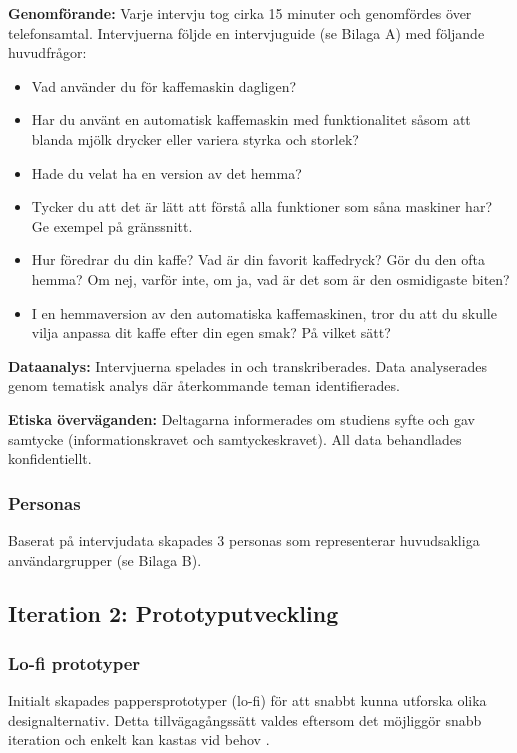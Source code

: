 \textbf{Genomförande:} Varje intervju tog cirka 15 minuter och genomfördes över telefonsamtal. Intervjuerna följde en intervjuguide (se Bilaga A) med följande huvudfrågor:
\begin{itemize}
    \item Vad använder du för kaffemaskin dagligen? 
    \item Har du använt en automatisk kaffemaskin med funktionalitet såsom att blanda mjölk drycker eller variera styrka och storlek?
    \item Hade du velat ha en version av det hemma? 
    \item Tycker du att det är lätt att förstå alla funktioner som såna maskiner har? Ge exempel på gränssnitt. 
    \item Hur föredrar du din kaffe? Vad är din favorit kaffedryck? Gör du den ofta hemma? Om nej, varför inte, om ja, vad är det som är den osmidigaste biten? 
    \item I en hemmaversion av den automatiska kaffemaskinen, tror du att du skulle vilja anpassa dit kaffe efter din egen smak? På vilket sätt? 
\end{itemize}

\textbf{Dataanalys:} Intervjuerna spelades in och transkriberades. Data analyserades genom tematisk analys där återkommande teman identifierades.

\textbf{Etiska överväganden:} Deltagarna informerades om studiens syfte och gav samtycke (informationskravet och samtyckeskravet). All data behandlades konfidentiellt.


\subsubsection{Personas}

Baserat på intervjudata skapades 3 personas som representerar huvudsakliga användargrupper (se Bilaga B). %


\subsection{Iteration 2: Prototyputveckling}

\subsubsection{Lo-fi prototyper}


Initialt skapades pappersprototyper (lo-fi) för att snabbt kunna utforska olika designalternativ. Detta tillvägagångssätt valdes eftersom det möjliggör snabb iteration och enkelt kan kastas vid behov \cite{sharp2019}.

